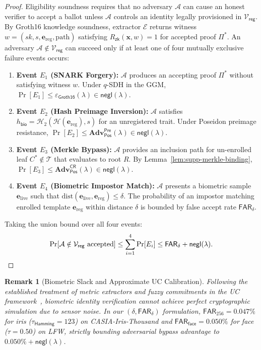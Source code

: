 \documentclass[10pt,letterpaper,journal]{IEEEtran}
\newtheorem{remark}[theorem]{Remark}
\begin{document}
\begin{proof}
Eligibility soundness requires that no adversary $\mathcal{A}$ can cause an honest verifier to accept a ballot unless $\mathcal{A}$ controls an identity legally provisioned in $\mathcal{V}_{\mathsf{reg}}$.
By Groth16 knowledge soundness, extractor $\mathcal{E}$ returns witness $w = (sk, s, \mathbf{e}_{\mathrm{reg}}, \mathrm{path})$ satisfying $R_{\mathsf{zk}}(\mathbf{x}, w) = 1$ for accepted proof $\Pi^\ast$.
An adversary $\mathcal{A} \notin \mathcal{V}_{\mathsf{reg}}$ can succeed only if at least one of four mutually exclusive failure events occurs:
\begin{enumerate}[leftmargin=*,noitemsep]
  \item \textbf{Event $E_1$ (SNARK Forgery):} $\mathcal{A}$ produces an accepting proof $\Pi^\ast$ without satisfying witness $w$. Under $q$-SDH in the GGM, $\Pr[E_1] \leq \varepsilon_{\mathsf{Groth16}}(\lambda) \in \mathsf{negl}(\lambda)$.
  \item \textbf{Event $E_2$ (Hash Preimage Inversion):} $\mathcal{A}$ satisfies $h_{\mathsf{bio}} = \mathcal{H}_2(\mathcal{H}(\mathbf{e}_{\mathrm{reg}}), s)$ for an unregistered trait. Under Poseidon preimage resistance, $\Pr[E_2] \leq \mathbf{Adv}_{\mathsf{Pos}}^{\mathsf{Pre}}(\lambda) \in \mathsf{negl}(\lambda)$.
  \item \textbf{Event $E_3$ (Merkle Bypass):} $\mathcal{A}$ provides an inclusion path for un-enrolled leaf $C^\ast \notin \mathcal{T}$ that evaluates to root $R$. By Lemma~\ref{lem:supp-merkle-binding}, $\Pr[E_3] \leq \mathbf{Adv}_{\mathsf{Pos}}^{\mathsf{CR}}(\lambda) \in \mathsf{negl}(\lambda)$.
  \item \textbf{Event $E_4$ (Biometric Impostor Match):} $\mathcal{A}$ presents a biometric sample $\mathbf{e}_{\mathrm{live}}$ such that $\mathrm{dist}(\mathbf{e}_{\mathrm{live}}, \mathbf{e}_{\mathrm{reg}}) \leq \delta$. The probability of an impostor matching enrolled template $\mathbf{e}_{\mathrm{reg}}$ within distance $\delta$ is bounded by false accept rate $\mathsf{FAR}_\delta$.
\end{enumerate}
Taking the union bound over all four events:
\begin{equation}
\label{eq:eligibility-bound}
  \Pr[\mathcal{A} \notin \mathcal{V}_{\mathsf{reg}} \text{ accepted}] \leq \sum_{i=1}^4 \Pr[E_i] \leq \mathsf{FAR}_\delta + \mathsf{negl}(\lambda).\qedhere
\end{equation}
\end{proof}

\begin{remark}[Biometric Slack and Approximate UC Calibration]
\label{rem:far}
Following the established treatment of metric extractors and fuzzy commitments in the UC framework~\cite{JuelsWattenberg1999,Dodis2004,Canetti2001}, biometric identity verification cannot achieve perfect cryptographic simulation due to sensor noise. In our $(\delta, \mathsf{FAR}_\delta)$ formulation, $\mathsf{FAR}_{256} = 0.047\%$ for iris ($\tau_{\mathsf{Hamming}} = 123$) on CASIA-Iris-Thousand and $\mathsf{FAR}_{\mathsf{face}} = 0.050\%$ for face ($\tau=0.50$) on LFW, strictly bounding adversarial bypass advantage to $0.050\% + \mathsf{negl}(\lambda)$.
\end{remark}
\end{document}

